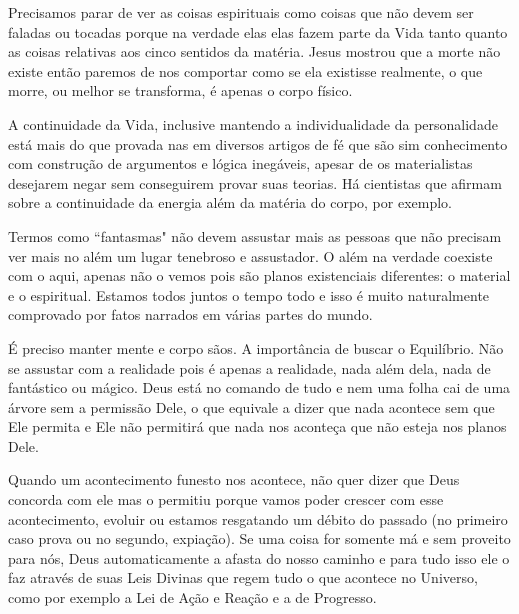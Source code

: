 \emdash{}Precisamos parar de ver as coisas espirituais como coisas que não devem ser faladas ou tocadas porque na verdade elas elas fazem parte da Vida tanto quanto as coisas relativas aos cinco sentidos da matéria. Jesus mostrou que a morte não existe então paremos de nos comportar como se ela existisse realmente, o que morre, ou melhor se transforma, é apenas o corpo físico.

\emdash{}A continuidade da Vida, inclusive mantendo a individualidade da personalidade está mais do que provada nas em diversos artigos de fé que são sim conhecimento com construção de argumentos e lógica inegáveis, apesar de os materialistas desejarem negar sem conseguirem provar suas teorias. Há cientistas que afirmam sobre a continuidade da energia além da matéria do corpo, por exemplo.

\emdash{}Termos como ``fantasmas" não devem assustar mais as pessoas que não precisam ver mais no além um lugar tenebroso e assustador. O além na verdade coexiste com o aqui, apenas não o vemos pois são planos existenciais diferentes: o material e o espiritual. Estamos todos juntos o tempo todo e isso é muito naturalmente comprovado por fatos narrados em várias partes do mundo.

\emdash{}É preciso manter mente e corpo sãos. A importância de buscar o Equilíbrio. Não se assustar com a realidade pois é apenas a realidade, nada além dela, nada de fantástico ou mágico. Deus está no comando de tudo e nem uma folha cai de uma árvore sem a permissão Dele, o que equivale a dizer que nada acontece sem que Ele permita e Ele não permitirá que nada nos aconteça que não esteja nos planos Dele.

\emdash{}Quando um acontecimento funesto nos acontece, não quer dizer que Deus concorda com ele mas o permitiu porque vamos poder crescer com esse acontecimento, evoluir ou estamos resgatando um débito do passado (no primeiro caso prova ou no segundo, expiação). Se uma coisa for somente má e sem proveito para nós, Deus automaticamente a afasta do nosso caminho e para tudo isso ele o faz através de suas Leis Divinas que regem tudo o que acontece no Universo, como por exemplo a Lei de Ação e Reação e a de Progresso.